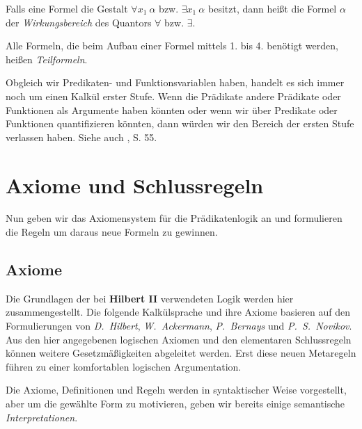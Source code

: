 \documentclass[a4paper,german,10pt,twoside]{book}
\theoremstyle{definition}
\theoremstyle{remark}
\begin{document}
\par
Falls eine Formel die Gestalt $\forall x_1 ~ \alpha$ bzw. $\exists x_1 ~ \alpha$ besitzt, dann hei{\ss}t die Formel $\alpha$ der
\emph{Wirkungsbereich} des Quantors $\forall$ bzw. $\exists$.

\par
Alle Formeln, die beim Aufbau einer Formel mittels 1. bis 4. ben{\"o}tigt werden, hei{\ss}en \emph{Teilformeln}.

\par
Obgleich wir Predikaten- und Funktionsvariablen haben, handelt es sich immer noch um einen Kalk{\"u}l erster Stufe. Wenn die Pr{\"a}dikate andere Pr{\"a}dikate oder Funktionen als Argumente haben k{\"o}nnten oder wenn wir {\"u}ber Predikate oder Funktionen quantifizieren k{\"o}nnten, dann w{\"u}rden wir den Bereich der ersten Stufe verlassen haben. Siehe auch \cite{mendelson}, S. 55.



\chapter{Axiome und Schlussregeln} \label{chapter5} \hypertarget{chapter5}{}

Nun geben wir das Axiomensystem f{\"u}r die Pr{\"a}dikatenlogik an und formulieren die Regeln um daraus neue Formeln zu gewinnen.

\section{Axiome} \label{chapter5_section1} \hypertarget{chapter5_section1}{}
Die Grundlagen der bei \textbf{Hilbert II} verwendeten Logik werden hier zusammengestellt. Die folgende Kalk{\"u}lsprache und ihre Axiome basieren auf den Formulierungen von \emph{D.~Hilbert}, \emph{W.~Ackermann}\cite{hilback}, \emph{P.~Bernays} und \emph{P.~S.~Novikov}\cite{novikov}. Aus den hier angegebenen logischen Axiomen und den elementaren Schlussregeln k{\"o}nnen weitere Gesetzm{\"a}{\ss}igkeiten abgeleitet werden. Erst diese neuen Metaregeln f{\"u}hren zu einer komfortablen logischen Argumentation.

\par
Die Axiome, Definitionen und Regeln werden in syntaktischer Weise vorgestellt, aber um die gew{\"a}hlte Form zu motivieren, geben wir bereits einige semantische \emph{Interpretationen}.
\end{document}
